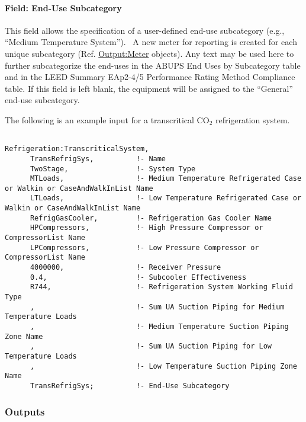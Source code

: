 \paragraph{Field: End-Use Subcategory}\label{field-end-use-subcategory-2-002}

This field allows the specification of a user-defined end-use subcategory (e.g., ``Medium Temperature System'').~ A new meter for reporting is created for each unique subcategory (Ref. \hyperref[outputmeter-and-outputmetermeterfileonly]{Output:Meter} objects). Any text may be used here to further subcategorize the end-uses in the ABUPS End Uses by Subcategory table and in the LEED Summary EAp2-4/5 Performance Rating Method Compliance table. If this field is left blank, the equipment will be assigned to the ``General'' end-use subcategory.

The following is an example input for a transcritical CO\(_{2}\) refrigeration system.

\begin{lstlisting}

Refrigeration:TranscriticalSystem,
      TransRefrigSys,          !- Name
      TwoStage,                !- System Type
      MTLoads,                 !- Medium Temperature Refrigerated Case or Walkin or CaseAndWalkInList Name
      LTLoads,                 !- Low Temperature Refrigerated Case or Walkin or CaseAndWalkInList Name
      RefrigGasCooler,         !- Refrigeration Gas Cooler Name
      HPCompressors,           !- High Pressure Compressor or CompressorList Name
      LPCompressors,           !- Low Pressure Compressor or CompressorList Name
      4000000,                 !- Receiver Pressure
      0.4,                     !- Subcooler Effectiveness
      R744,                    !- Refrigeration System Working Fluid Type
      ,                        !- Sum UA Suction Piping for Medium Temperature Loads
      ,                        !- Medium Temperature Suction Piping Zone Name
      ,                        !- Sum UA Suction Piping for Low Temperature Loads
      ,                        !- Low Temperature Suction Piping Zone Name
      TransRefrigSys;          !- End-Use Subcategory
\end{lstlisting}

\subsubsection{Outputs}\label{outputs-3-016}

